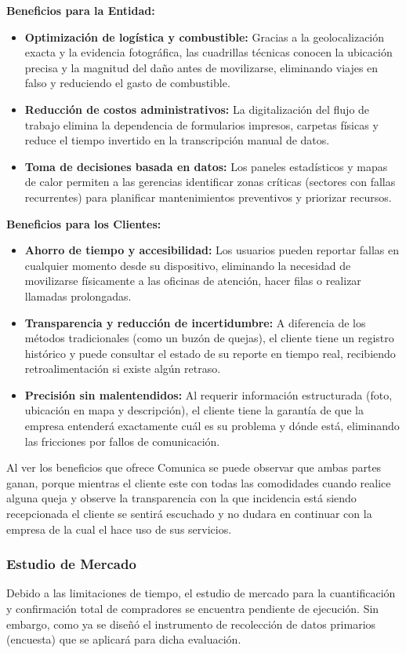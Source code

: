 \textbf{Beneficios para la Entidad:}
\begin{itemize}
	\item \textbf{Optimización de logística y combustible:} Gracias a la geolocalización exacta y la evidencia fotográfica, las cuadrillas técnicas conocen la ubicación precisa y la magnitud del daño antes de movilizarse, eliminando viajes en falso y reduciendo el gasto de combustible.
	\item \textbf{Reducción de costos administrativos:} La digitalización del flujo de trabajo elimina la dependencia de formularios impresos, carpetas físicas y reduce el tiempo invertido en la transcripción manual de datos.
	\item \textbf{Toma de decisiones basada en datos:} Los paneles estadísticos y mapas de calor permiten a las gerencias identificar zonas críticas (sectores con fallas recurrentes) para planificar mantenimientos preventivos y priorizar recursos.
\end{itemize}

\textbf{Beneficios para los Clientes:}
\begin{itemize}
	\item \textbf{Ahorro de tiempo y accesibilidad:} Los usuarios pueden reportar fallas en cualquier momento desde su dispositivo, eliminando la necesidad de movilizarse físicamente a las oficinas de atención, hacer filas o realizar llamadas prolongadas.
	\item \textbf{Transparencia y reducción de incertidumbre:} A diferencia de los métodos tradicionales (como un buzón de quejas), el cliente tiene un registro histórico y puede consultar el estado de su reporte en tiempo real, recibiendo retroalimentación si existe algún retraso.
	\item \textbf{Precisión sin malentendidos:} Al requerir información estructurada (foto, ubicación en mapa y descripción), el cliente tiene la garantía de que la empresa entenderá exactamente cuál es su problema y dónde está, eliminando las fricciones por fallos de comunicación.
\end{itemize}

Al ver los beneficios que ofrece Comunica se puede observar que ambas partes ganan, porque mientras el cliente este con todas las comodidades cuando realice alguna queja y observe la transparencia con la que incidencia está siendo recepcionada el cliente se sentirá escuchado y no dudara en continuar con la empresa de la cual el hace uso de sus servicios.

\subsubsection{Estudio de Mercado}
Debido a las limitaciones de tiempo, el estudio de mercado para la cuantificación y confirmación total de compradores se encuentra pendiente de ejecución. Sin embargo, como ya se diseñó el instrumento de recolección de datos primarios (encuesta) que se aplicará para dicha evaluación.

